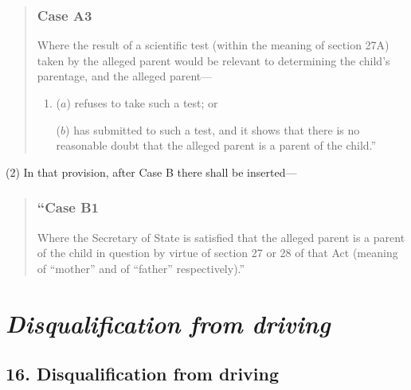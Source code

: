 \documentclass[12pt,a4paper]{article}
\begin{document}
\begin{quotation}
\subsubsection*{Case A3}

Where the result of a scientific test (within the meaning of section 27A) taken by the alleged parent would be relevant to determining the child’s parentage, and the alleged parent—
\begin{enumerate}\item[]
($a$) refuses to take such a test; or

($b$) has submitted to such a test, and it shows that there is no reasonable doubt that the alleged parent is a parent of the child.”
\end{enumerate}
\end{quotation}

(2) In that provision, after Case B there shall be inserted—
\begin{quotation}
\subsubsection*{“Case B1}

Where the Secretary of State is satisfied that the alleged parent is a parent of the child in question by virtue of section 27 or 28 of that Act (meaning of “mother” and of “father” respectively).”
\end{quotation}

\section{\itshape Disqualification from driving}

\subsection{16. Disqualification from driving}
\end{document}
